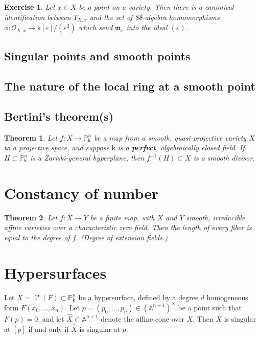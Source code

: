 \documentclass[11pt]{article}
\newcommand{\A}{\mathbb{A}}
\renewcommand{\P}{\mathbb{P}}
\renewcommand{\O}{\mathcal{O}}
\renewcommand{\k}{\mathsf{k}}
\newcommand{\fm}{\mathfrak{m}}
\renewcommand{\to}{\longrightarrow}
\DeclareMathOperator{\V}{\mathcal{V}}
\newcommand{\A}{\mathbb A}
\renewcommand{\k}{\mathsf{k}}
\renewcommand{\P}{\mathbb P}
\renewcommand{\to}{{\longrightarrow}}
\newtheorem{theorem}{Theorem}[section]
\newtheorem{exercise}{Exercise}[section]
\begin{document}
\begin{exercise}
Let \(x \in X\) be a point on a variety. Then there is a canonical identification between \(T_{X,x}\) and the set of \$\k\$-algebra homomorphisms \(\phi : \O_{X,x} \to \k[\varepsilon]/(\varepsilon^2)\) which send \(\fm_{x}\) into the ideal \((\varepsilon)\).
\end{exercise}

\subsection{Singular points and smooth points}
\label{sec:org0b0b5a2}

\subsection{The nature of the local ring at a smooth point}
\label{sec:org3f941b1}

\subsection{Bertini's theorem(s)}
\label{sec:orgd5ab332}

\begin{theorem}
Let \(f: X \to \P^n_{\k}\) be a map from a smooth, quasi-projective variety \(X\) to a projective space, and suppose \(\k\) is a \textbf{\emph{perfect}}, algebraically closed field.  If \(H \subset \P^n_{\k}\) is a Zariski-general hyperplane, then \(f^{-1}(H) \subset X\) is a smooth divisor.
\end{theorem}




\section{Constancy of number}
\label{sec:org2cba497}

\begin{theorem}
Let \(f: X \to Y\) be a finite map, with \(X\) and \(Y\) smooth, irreducible affine varieties over a characteristic zero field. Then the length of every fiber is equal to the degree of \(f\). (Degree of extension fields.)
\end{theorem}

\section{Hypersurfaces}
\label{sec:orgb2ed85c}

Let \(X = \V(F) \subset \P^n_{\k}\) be a hypersurface, defined by a degree \(d\) homogeneous form \(F(x_0, \dots, x_n)\).   Let \(p = (p_0, \ldots, p_n) \in \left( \A^{n+1} \right)^{\times}\) be a point such that \(F(p) = 0\), and let \(\hat{X} \subset  \A^{n+1}\) denote the affine cone over \(X\).  Then \(X\) is singular at \([p]\) if and only if \(\hat{X}\) is singular at \(p\). 
\end{document}
